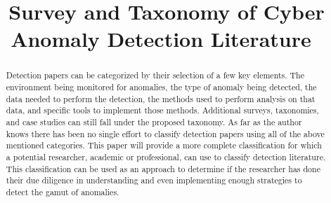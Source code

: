 \documentclass[conference]{IEEEtran}
\begin{document}
\title{Survey and Taxonomy of Cyber Anomaly Detection Literature\
}

\author{
}

\maketitle

\begin{abstract}
Detection papers can be categorized by their selection of a few key elements. The environment being monitored for anomalies, the type of anomaly being detected, the data needed to perform the detection, the methods used to perform analysis on that data, and specific tools to implement those methods. Additional surveys, taxonomies, and case studies can still fall under the proposed taxonomy. As far as the author knows there has been no single effort to classify detection papers using all of the above mentioned categories. This paper will provide a more complete classification for which a potential researcher, academic or professional, can use to classify detection literature. This classification can be used as an approach to determine if the researcher has done their due diligence in understanding and even implementing enough strategies to detect the gamut of anomalies. 
\end{abstract}
\end{document}
